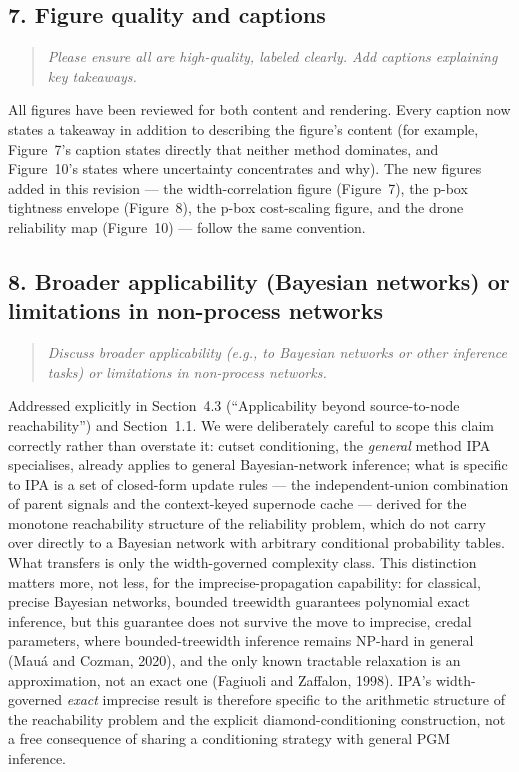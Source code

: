 \documentclass[11pt]{article}
\newenvironment{revcomment}
  {\begin{quote}\itshape\color{gray!60!black}}
  {\end{quote}}
\begin{document}
\subsection*{7. Figure quality and captions}
\begin{revcomment}
Please ensure all are high-quality, labeled clearly. Add captions explaining key takeaways.
\end{revcomment}

All figures have been reviewed for both content and rendering. Every caption now states a takeaway in addition to describing the figure's content (for example, Figure~7's caption states directly that neither method dominates, and Figure~10's states where uncertainty concentrates and why). The new figures added in this revision --- the width-correlation figure (Figure~7), the p-box tightness envelope (Figure~8), the p-box cost-scaling figure, and the drone reliability map (Figure~10) --- follow the same convention.

\subsection*{8. Broader applicability (Bayesian networks) or limitations in non-process networks}
\begin{revcomment}
Discuss broader applicability (e.g., to Bayesian networks or other inference tasks) or limitations in non-process networks.
\end{revcomment}

Addressed explicitly in Section~4.3 (``Applicability beyond source-to-node reachability'') and Section~1.1. We were deliberately careful to scope this claim correctly rather than overstate it: cutset conditioning, the \emph{general} method IPA specialises, already applies to general Bayesian-network inference; what is specific to IPA is a set of closed-form update rules --- the independent-union combination of parent signals and the context-keyed supernode cache --- derived for the monotone reachability structure of the reliability problem, which do not carry over directly to a Bayesian network with arbitrary conditional probability tables. What transfers is only the width-governed complexity class. This distinction matters more, not less, for the imprecise-propagation capability: for classical, precise Bayesian networks, bounded treewidth guarantees polynomial exact inference, but this guarantee does not survive the move to imprecise, credal parameters, where bounded-treewidth inference remains NP-hard in general (Mau\'a and Cozman, 2020), and the only known tractable relaxation is an approximation, not an exact one (Fagiuoli and Zaffalon, 1998). IPA's width-governed \emph{exact} imprecise result is therefore specific to the arithmetic structure of the reachability problem and the explicit diamond-conditioning construction, not a free consequence of sharing a conditioning strategy with general PGM inference.
\end{document}
